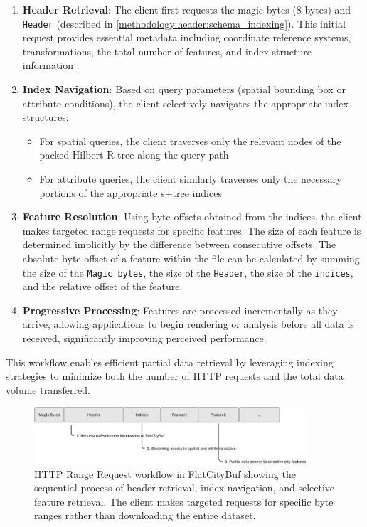 \begin{enumerate}
  \item \textbf{Header Retrieval}: The client first requests the magic bytes (8 bytes) and \texttt{Header} (described in \autoref{methodology:header:schema_indexing}). This initial request provides essential metadata including coordinate reference systems, transformations, the total number of features, and index structure information \etc.

  \item \textbf{Index Navigation}: Based on query parameters (spatial bounding box or attribute conditions), the client selectively navigates the appropriate index structures:
    \begin{itemize}
      \item For spatial queries, the client traverses only the relevant nodes of the packed Hilbert R-tree along the query path
      \item For attribute queries, the client similarly traverses only the necessary portions of the appropriate \ac{s+tree} indices
    \end{itemize}

  \item \textbf{Feature Resolution}: Using byte offsets obtained from the indices, the client makes targeted range requests for specific features. The size of each feature is determined implicitly by the difference between consecutive offsets. The absolute byte offset of a feature within the file can be calculated by summing the size of the \texttt{Magic bytes}, the size of the \texttt{Header}, the size of the \texttt{indices}, and the relative offset of the feature.

  \item \textbf{Progressive Processing}: Features are processed incrementally as they arrive, allowing applications to begin rendering or analysis before all data is received, significantly improving perceived performance.
\end{enumerate}

This workflow enables efficient partial data retrieval by leveraging indexing strategies to minimize both the number of HTTP requests and the total data volume transferred.

\begin{figure}[htbp]
  \centering
  \includegraphics[width=0.9\textwidth]{figs/methodology/range_request_workflow.png}
  \caption{HTTP Range Request workflow in FlatCityBuf showing the sequential process of header retrieval, index navigation, and selective feature retrieval. The client makes targeted requests for specific byte ranges rather than downloading the entire dataset.}
  \label{fig:methodology:http_range_requests:range_request_workflow}
\end{figure}

